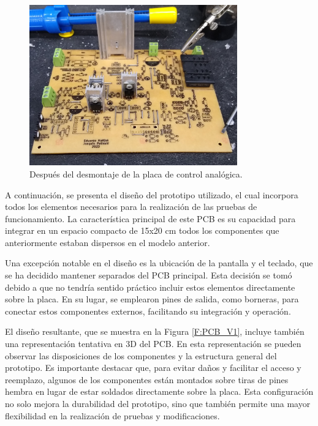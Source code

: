 \begin{figure}[H]
    \centering
    \includegraphics[width=0.8\textwidth]{./imagenes/fotos/desmontada.jpg}
    \caption{Después del desmontaje de la placa de control analógica.}
    \label{F:desmontaje_de_la_placa}
\end{figure}\par 
A continuación, se presenta el diseño del prototipo utilizado, el cual incorpora todos los elementos necesarios para la realización de las pruebas de funcionamiento. La característica principal de este PCB es su capacidad para integrar en un espacio compacto de 15x20 cm todos los componentes que anteriormente estaban dispersos en el modelo anterior. \par 
Una excepción notable en el diseño es la ubicación de la pantalla y el teclado, que se ha decidido mantener separados del PCB principal. Esta decisión se tomó debido a que no tendría sentido práctico incluir estos elementos directamente sobre la placa. En su lugar, se emplearon pines de salida, como borneras, para conectar estos componentes externos, facilitando su integración y operación. \par 
El diseño resultante, que se muestra en la Figura \ref{F:PCB_V1}, incluye también una representación tentativa en 3D del PCB. En esta representación se pueden observar las disposiciones de los componentes y la estructura general del prototipo. Es importante destacar que, para evitar daños y facilitar el acceso y reemplazo, algunos de los componentes están montados sobre tiras de pines hembra en lugar de estar soldados directamente sobre la placa. Esta configuración no solo mejora la durabilidad del prototipo, sino que también permite una mayor flexibilidad en la realización de pruebas y modificaciones. 
